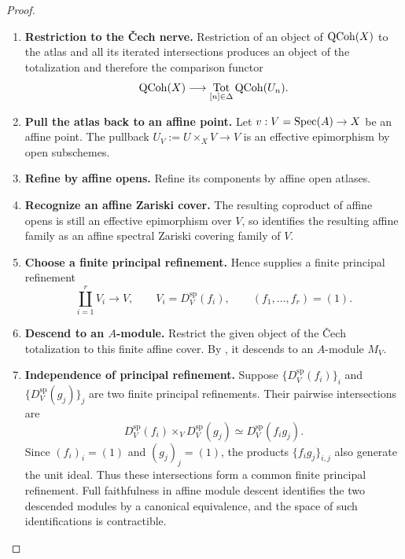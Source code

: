 \begin{proof}
\leavevmode
\begin{enumerate}[label=\textup{(\arabic*)}]
    \item \textbf{Restriction to the \v{C}ech nerve.}
    Restriction of an object of \(\operatorname{QCoh}(X)\) to the atlas and all its iterated
    intersections produces an object of the totalization and therefore the
    comparison functor
    \[
        \operatorname{QCoh}(X)
        \longrightarrow
        \operatorname*{Tot}_{[n]\in\Delta}\operatorname{QCoh}(U_n).
    \]

    \item \textbf{Pull the atlas back to an affine point.}
    Let \(v:V=\operatorname{Spec}(A)\to X\) be an affine point. The pullback
    \(U_V:=U\times_XV\to V\) is an effective epimorphism by open
    subschemes.

    \item \textbf{Refine by affine opens.}
    Refine its components by affine open atlases.

    \item \textbf{Recognize an affine Zariski cover.}
    The resulting
    coproduct of affine opens is still an effective epimorphism over \(V\),
    so  identifies the resulting
    affine family as an affine spectral Zariski covering family of \(V\).

    \item \textbf{Choose a finite principal refinement.}
    Hence  supplies a finite principal
    refinement
    \[
        \coprod_{i=1}^r
        V_i
        \longrightarrow
        V,
        \qquad
        V_i=D_V^{\mathrm{sp}}(f_i),
        \qquad
        (f_1,\ldots,f_r)=(1).
    \]

    \item \textbf{Descend to an \(A\)-module.}
    Restrict the given object of the \v{C}ech totalization to this finite
    affine cover. By , it descends to an
    \(A\)-module \(M_V\).

    \item \textbf{Independence of principal refinement.}
    Suppose \(\{D_V^{\mathrm{sp}}(f_i)\}_i\) and
    \(\{D_V^{\mathrm{sp}}(g_j)\}_j\) are two finite principal refinements.
    Their pairwise intersections are
    \[
        D_V^{\mathrm{sp}}(f_i)
        \times_V
        D_V^{\mathrm{sp}}(g_j)
        \simeq
        D_V^{\mathrm{sp}}(f_ig_j).
    \]
    Since \((f_i)_i=(1)\) and \((g_j)_j=(1)\), the products
    \(\{f_ig_j\}_{i,j}\) also generate the unit ideal. Thus these
    intersections form a common finite principal refinement. Full
    faithfulness in affine module descent identifies the two descended
    modules by a canonical equivalence, and the space of such
    identifications is contractible.


\end{enumerate}
\end{proof}
